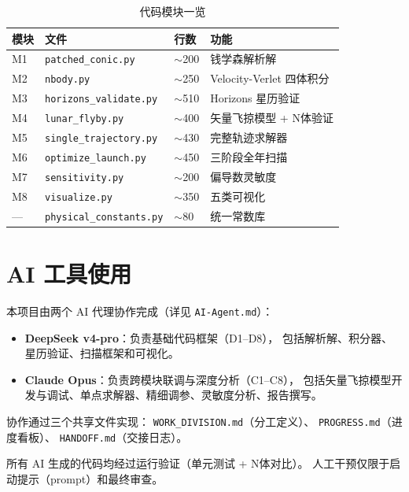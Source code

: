 \documentclass[a4paper,12pt]{article}
\begin{document}
\begin{table}[H]
  \centering
  \caption{代码模块一览}\label{tab:modules}
  \begin{tabular}{llll}
    \toprule
    模块 & 文件 & 行数 & 功能 \\
    \midrule
    M1 & \texttt{patched\_conic.py}      & $\sim$200 & 钱学森解析解 \\
    M2 & \texttt{nbody.py}               & $\sim$250 & Velocity-Verlet 四体积分 \\
    M3 & \texttt{horizons\_validate.py}   & $\sim$510 & Horizons 星历验证 \\
    M4 & \texttt{lunar\_flyby.py}         & $\sim$400 & 矢量飞掠模型 + N体验证 \\
    M5 & \texttt{single\_trajectory.py}   & $\sim$430 & 完整轨迹求解器 \\
    M6 & \texttt{optimize\_launch.py}     & $\sim$450 & 三阶段全年扫描 \\
    M7 & \texttt{sensitivity.py}          & $\sim$200 & 偏导数灵敏度 \\
    M8 & \texttt{visualize.py}            & $\sim$350 & 五类可视化 \\
    --- & \texttt{physical\_constants.py} & $\sim$80  & 统一常数库 \\
    \bottomrule
  \end{tabular}
\end{table}


\section{AI 工具使用}\label{sec:ai}

本项目由两个 AI 代理协作完成（详见 \texttt{AI-Agent.md}）：
\begin{itemize}
  \item \textbf{DeepSeek v4-pro}：负责基础代码框架（D1--D8），
        包括解析解、积分器、星历验证、扫描框架和可视化。
  \item \textbf{Claude Opus}：负责跨模块联调与深度分析（C1--C8），
        包括矢量飞掠模型开发与调试、单点求解器、精细调参、灵敏度分析、报告撰写。
\end{itemize}

协作通过三个共享文件实现：
\texttt{WORK\_DIVISION.md}（分工定义）、
\texttt{PROGRESS.md}（进度看板）、
\texttt{HANDOFF.md}（交接日志）。

所有 AI 生成的代码均经过运行验证（单元测试 + N体对比）。
人工干预仅限于启动提示（prompt）和最终审查。
\end{document}
